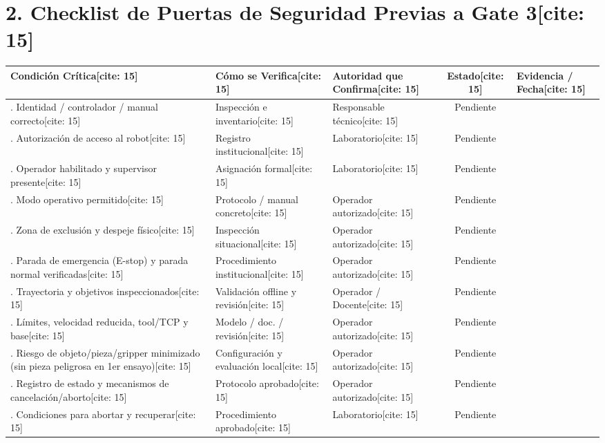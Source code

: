 \documentclass[11pt, a4paper]{article}
\begin{document}
\section*{2. Checklist de Puertas de Seguridad Previas a Gate 3[cite: 15]}
\begin{center}
\footnotesize
\renewcommand{\arraystretch}{1.45}
\begin{tabularx}{\textwidth}{|>{\hsize=1.25\hsize\raggedright\arraybackslash}X|>{\hsize=1.05\hsize\raggedright\arraybackslash}X|>{\hsize=0.85\hsize\raggedright\arraybackslash}X|c|>{\hsize=0.85\hsize\raggedright\arraybackslash}X|}
\hline
\rowcolor{ucbblue!15}
\textbf{Condición Crítica}[cite: 15] & \textbf{Cómo se Verifica}[cite: 15] & \textbf{Autoridad que Confirma}[cite: 15] & \textbf{Estado}[cite: 15] & \textbf{Evidencia / Fecha}[cite: 15] \\ \hline
1. Identidad / controlador / manual correcto[cite: 15] & Inspección e inventario[cite: 15] & Responsable técnico[cite: 15] & Pendiente & \\ \hline
2. Autorización de acceso al robot[cite: 15] & Registro institucional[cite: 15] & Laboratorio[cite: 15] & Pendiente & \\ \hline
3. Operador habilitado y supervisor presente[cite: 15] & Asignación formal[cite: 15] & Laboratorio[cite: 15] & Pendiente & \\ \hline
4. Modo operativo permitido[cite: 15] & Protocolo / manual concreto[cite: 15] & Operador autorizado[cite: 15] & Pendiente & \\ \hline
5. Zona de exclusión y despeje físico[cite: 15] & Inspección situacional[cite: 15] & Operador autorizado[cite: 15] & Pendiente & \\ \hline
6. Parada de emergencia (E-stop) y parada normal verificadas[cite: 15] & Procedimiento institucional[cite: 15] & Operador autorizado[cite: 15] & Pendiente & \\ \hline
7. Trayectoria y objetivos inspeccionados[cite: 15] & Validación offline y revisión[cite: 15] & Operador / Docente[cite: 15] & Pendiente & \\ \hline
8. Límites, velocidad reducida, tool/TCP y base[cite: 15] & Modelo / doc. / revisión[cite: 15] & Operador autorizado[cite: 15] & Pendiente & \\ \hline
9. Riesgo de objeto/pieza/gripper minimizado (sin pieza peligrosa en 1er ensayo)[cite: 15] & Configuración y evaluación local[cite: 15] & Operador autorizado[cite: 15] & Pendiente & \\ \hline
10. Registro de estado y mecanismos de cancelación/aborto[cite: 15] & Protocolo aprobado[cite: 15] & Operador autorizado[cite: 15] & Pendiente & \\ \hline
11. Condiciones para abortar y recuperar[cite: 15] & Procedimiento aprobado[cite: 15] & Laboratorio[cite: 15] & Pendiente & \\ \hline
\end{tabularx}
\end{center}
\end{document}

